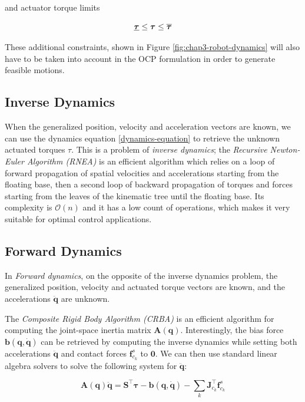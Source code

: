 \noindent and actuator torque limits

\begin{equation}
  \underline{\boldsymbol{\tau}} \le \boldsymbol{\tau} \le
  \overline{\boldsymbol{\tau}}
\end{equation}

\noindent These additional constraints, shown in Figure
\ref{fig:chap3-robot-dynamics} will also have to be taken into account
in the OCP formulation in order to generate feasible motions.

\subsection{Inverse Dynamics}

When the generalized position, velocity and acceleration vectors are
known, we can use the dynamics equation \ref{dynamics-equation} to
retrieve the unknown actuated torques $\mathbb{\tau}$. This is a
problem of \emph{inverse dynamics}; the \emph{Recursive Newton-Euler
  Algorithm (RNEA)} is an efficient algorithm which relies on a loop
of forward propagation of spatial velocities and accelerations
starting from the floating base, then a second loop of backward
propagation of torques and forces starting from the leaves of the
kinematic tree until the floating base. Its complexity is
$\mathcal{O}(n)$ and it has a low count of operations, which makes it
very suitable for optimal control applications.

\subsection{Forward Dynamics}

In \emph{Forward dynamics}, on the opposite of the inverse dynamics
problem, the generalized position, velocity and actuated torque
vectors are known, and the accelerations $\ddot{\mathbf{q}}$ are
unknown.

The \emph{Composite Rigid Body Algorithm (CRBA)} is an efficient
algorithm for computing the joint-space inertia matrix
$\mathbf{A}(\mathbf{q})$. Interestingly, the bias force
$\mathbf{b}(\mathbf{q},\dot{\mathbf{q}})$ can be retrieved by computing the
inverse dynamics while setting both accelerations $\ddot{\mathbf{q}}$
and contact forces $\mathbf{f}^s_{c_k}$ to $\mathbf{0}$. We can then
use standard linear algebra solvers to solve the following system for
$\ddot{\mathbf{q}}$:

\begin{equation}
  \mathbf{A}(\mathbf{q})\ddot{\mathbf{q}} =
  \mathbf{S}^\top\boldsymbol{\tau} -
  \mathbf{b}(\mathbf{q},\dot{\mathbf{q}}) -
  \sum_k\mathbf{J}_{c_k}^\top\mathbf{f}^s_{c_k}
\end{equation}

